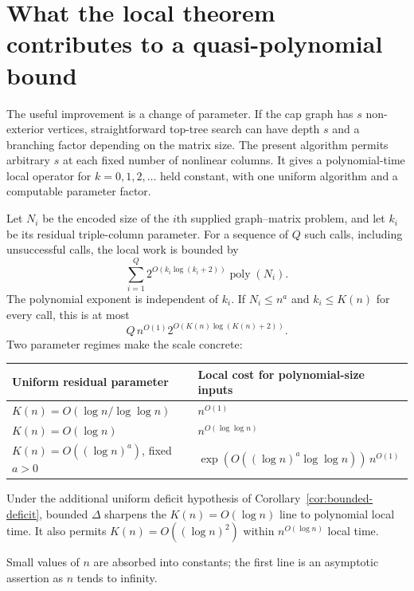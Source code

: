 \section{What the local theorem contributes to a quasi-polynomial bound}
\label{sec:global}

The useful improvement is a change of parameter. If the cap graph has
$s$ non-exterior vertices, straightforward top-tree search can have
depth $s$ and a branching factor depending on the matrix size. The present
algorithm permits arbitrary $s$ at each fixed number of nonlinear
columns. It gives a polynomial-time local operator for $k=0,1,2,\ldots$
held constant, with one uniform algorithm and a computable parameter factor.

Let $N_i$ be the encoded size of the $i$th supplied graph--matrix problem,
and let $k_i$ be its residual triple-column parameter. For a sequence of
$Q$ such calls, including unsuccessful calls, the local work is bounded by
\begin{equation}
 \sum_{i=1}^{Q}2^{O(k_i\log(k_i+2))}\operatorname{poly}(N_i).
 \label{eq:cumulative-local}
\end{equation}
The polynomial exponent is independent of $k_i$. If $N_i\le n^a$ and
$k_i\le K(n)$ for every call, this is at most
\[
             Q\,n^{O(1)}2^{O(K(n)\log(K(n)+2))}.
\]
Two parameter regimes make the scale concrete:
\begin{center}
\begin{tabular}{@{}ll@{}}
\toprule
Uniform residual parameter & Local cost for polynomial-size inputs \\
\midrule
$K(n)=O(\log n/\log\log n)$ & $n^{O(1)}$ \\
$K(n)=O(\log n)$ & $n^{O(\log\log n)}$ \\
$K(n)=O((\log n)^a)$, fixed $a>0$ &
$\exp(O((\log n)^a\log\log n))\,n^{O(1)}$ \\
\bottomrule
\end{tabular}
\end{center}
Under the additional uniform deficit hypothesis of
Corollary~\ref{cor:bounded-deficit}, bounded $\Delta$ sharpens the
$K(n)=O(\log n)$ line to polynomial local time. It also permits
$K(n)=O((\log n)^2)$ within $n^{O(\log n)}$ local time.

Small values of $n$ are absorbed into constants; the first line is an
asymptotic assertion as $n$ tends to infinity.

